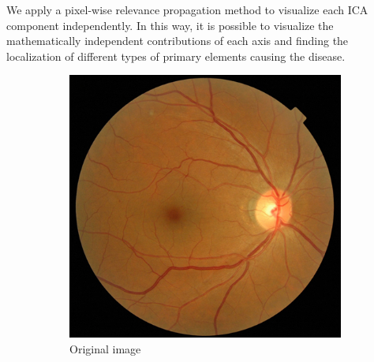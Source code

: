 \documentclass[review]{elsarticle}
\theoremstyle{definition} %
\theoremstyle{remark}
\begin{document}
We apply a pixel-wise relevance propagation method to visualize each ICA component independently. In this way, it is possible to visualize the mathematically independent contributions of each axis and finding the localization of different types of primary elements causing the disease. 


\begin{figure}[h!]
	\centering
	\begin{subfigure}[b]{0.28\textwidth}
		\centering
		\includegraphics[width=\textwidth]{./figures/ica_retine_maps/G1-P2/g1.png}
		\caption{Original image}	
	\end{subfigure}
	\begin{subfigure}[b]{0.28\textwidth}
		\centering

\end{subfigure}
\end{figure}
\end{document}
